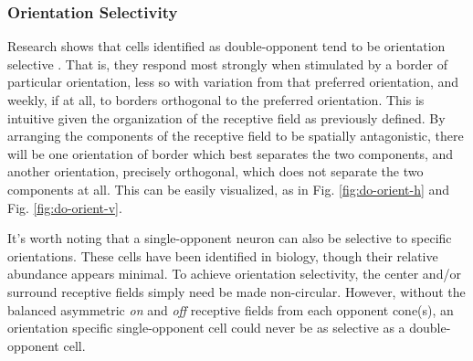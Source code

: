 \documentclass[journal,onecolumn]{IEEEtran}
\begin{document}
\subsubsection*{Orientation Selectivity}

Research shows that cells identified as double-opponent tend to be orientation selective \cite{johnson:2008, sincich:2005, schluppeck:2002, chalupa:vol2}. That is, they respond most strongly when stimulated by a border of particular orientation, less so with variation from that preferred orientation, and weekly, if at all, to borders orthogonal to the preferred orientation. This is intuitive given the organization of the receptive field as previously defined. By arranging the components of the receptive field to be spatially antagonistic, there will be one orientation of border which best separates the two components, and another orientation, precisely orthogonal, which does not separate the two components at all. This can be easily visualized, as in Fig. \ref{fig:do-orient-h} and Fig. \ref{fig:do-orient-v}.

It's worth noting that a single-opponent neuron can also be selective to specific orientations. These cells have been identified in biology, though their relative abundance appears minimal. To achieve orientation selectivity, the center and/or surround receptive fields simply need be made non-circular. However, without the balanced asymmetric \textit{on} and \textit{off} receptive fields from each opponent cone(s), an orientation specific single-opponent cell could never be as selective as a double-opponent cell.
\end{document}
